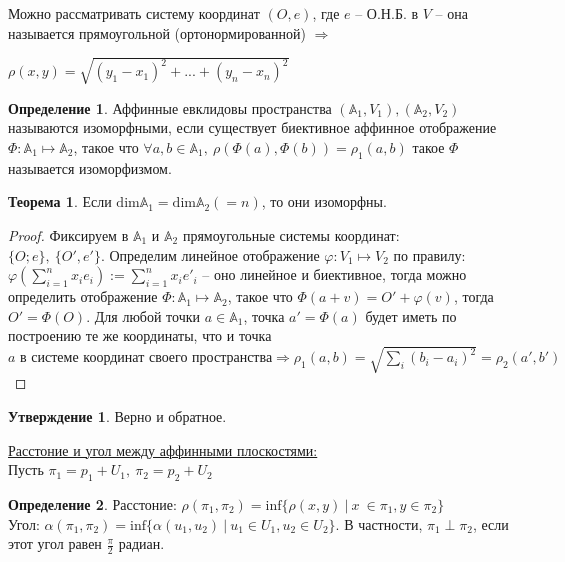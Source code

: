 \documentclass[a4paper, 12pt]{article}
\theoremstyle{definition}
\newtheorem*{definition}{Определение}
\newtheorem*{theorem}{Теорема}
\newtheorem*{subtheorem}{Утверждение}
\begin{document}
    Можно рассматривать систему координат $(O, e)$, где 
    $e$ -- О.Н.Б. в $V$ -- она называется прямоугольной 
    (ортонормированной) $\Longrightarrow$
    \begin{flushright}
        $\rho(x,y) = 
        \sqrt{(y_1 - x_1)^2 +...+ (y_n - x_n)^2}$      
    \end{flushright}
    \begin{definition}
        Аффинные евклидовы пространства $(\mathbb{A}_1, V_1),
        (\mathbb{A}_2, V_2)$ называются изоморфными, если 
        существует биективное аффинное отображение 
        $\Phi:\mathbb{A}_1 \longmapsto \mathbb{A}_2$,
        такое что $\forall a,b \in \mathbb{A}_1,\ 
        \rho(\Phi(a), \Phi(b)) = \rho_1(a,b)$ такое $\Phi$
        называется изоморфизмом. 
    \end{definition}
    \begin{theorem}
        Если $\text{dim}\mathbb{A}_1 = \text{dim}\mathbb{A}_2
        (= n)$, то они изоморфны.
    \end{theorem}
    \begin{proof}
        Фиксируем в $\mathbb{A}_1$ и $\mathbb{A}_2$ 
        прямоугольные системы координат:\\
        $\{O; e\},\ \{O', e'\}$. Определим линейное 
        отображение $\varphi:V_1 \longmapsto V_2$ по правилу:
        $\varphi(\sum\limits_{i=1}^{n} x_ie_i) := 
        \sum\limits_{i=1}^{n} x_ie'_i$ -- оно линейное и 
        биективное, тогда можно определить отображение $\Phi:
        \mathbb{A}_1 \longmapsto \mathbb{A}_2$, такое что 
        $\Phi(a + v) = O' + \varphi(v)$, тогда $O' = \Phi(O)
        $. Для любой точки $a \in \mathbb{A}_1$, точка 
        $a' = \Phi(a)$ будет иметь по построению те же 
        координаты, что и точка $a \text{ в системе координат 
        своего пространства} \Longrightarrow 
        \rho_1(a,b) = \sqrt{\sum\limits_{i} (b_i - a_i)^2} = 
        \rho_2(a', b')$ 
    \end{proof}
    \begin{subtheorem}
        Верно и обратное.
    \end{subtheorem}
    \underline{Расстоние и угол между аффинными плоскостями:}\\
    Пусть $\pi_1 = p_1 + U_1,\ \pi_2 = p_2 + U_2$
    \begin{definition}
        Расстоние: $\rho(\pi_1,\pi_2) = \text{inf}\{\rho(x,y)\ |
        \ x \ \in \pi_1, y \in \pi_2\}$\\
        Угол: $\alpha(\pi_1, \pi_2) = \text{inf}\{\alpha(u_1, 
        u_2)\ |\ u_1 \in U_1, u_2 \in U_2\}$. В частности,
        $\pi_1 \perp \pi_2$, если этот угол равен $\frac{\pi}{2}
        $ радиан.
    \end{definition} 
\end{document}
